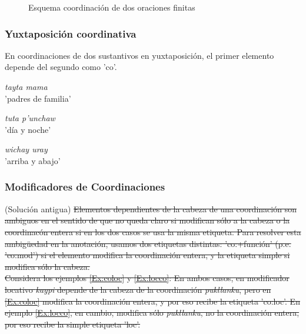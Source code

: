 \documentclass[a4paper,11pt,DIV12]{scrartcl}
\begin{document}
\begin{figure}
\begin{center}
\caption{Esquema coordinaci\'on de dos oraciones finitas}\label{Fig:linkercoord}
\end{center}
\end{figure}

\subsubsection{Yuxtaposici\'on coordinativa}\label{Sec:coordyuxta}

En coordinaciones de dos sustantivos en yuxtaposici\'on, el primer elemento depende del segundo como 'co'.

\begin{examples}
 \item {\em tayta mama}\\
      'padres de familia'
  \item {\em tuta p'unchaw}\\
      'd\'ia y noche'
\item {\em wichay uray}\\
      'arriba y abajo'\\
	\hfill{\small \citep[133]{Cusi2}}
\end{examples}

\subsubsection{Modificadores de Coordinaciones}\label{Sec:coordmod}

(Soluci\'on antigua)
\sout{Elementos dependientes de la cabeza de una coordinaci\'on son ambiguos en el sentido de que no queda claro si modifican s\'olo a la cabeza o la coordinac\'on entera si en los dos casos se usa la misma etiqueta. Para resolver esta ambig\"uedad en la anotaci\'on, usamos dos etiquetas distintas: 'co:+funci\'on' (p.e. 'co:mod') si el elemento modifica la coordinaci\'on entera, y la etiqueta simple si modifica s\'olo la cabeza.\\
Considera los ejemplos \ref{Ex:coloc} y \ref{Ex:locco}: En ambos casos, en modificador locativo {\em kaypi} depende de la cabeza de la coordinaci\'on {\em pukllanku}, pero en \ref{Ex:coloc} modifica la coordinaci\'on entera, y por eso recibe la etiqueta 'co:loc'. En ejemplo \ref{Ex:locco}, en cambio, modifica s\'olo {\em pukllanku}, no la coordinaci\'on entera, por eso recibe la simple etiqueta 'loc'.}
\end{document}

